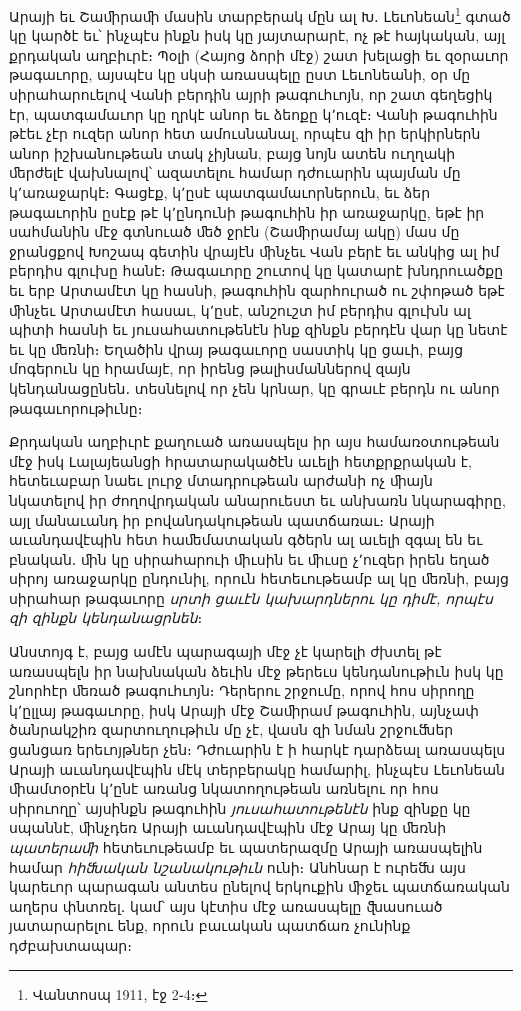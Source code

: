 \documentclass{article}
\begin{document}
{Արայի եւ Շաﬕրաﬕ մասին տարբերակ մըն ալ Խ․ Լեւոնեան\footnote{Վանտոսպ 1911, էջ 2֊4։} գտած կը կարծէ եւ՝ ինչպէս ինքն իսկ կը յայտարարէ, ոչ թէ հայկական, այլ քրդական աղբիւրէ։ Պօլի (Հայոց ձորի մէջ) շատ խելացի եւ զօրաւոր թագաւորը, այսպէս կը սկսի առասպելը ըստ Լեւոնեանի, օր մը սիրահարուելով Վանի բերդին այրի թագուհւոյն, որ շատ գեղեցիկ էր, պատգամաւոր կը ղրկէ անոր եւ ձեոքը կ՚ուզէ։ Վանի թագուհին թէեւ չէր ուզեր անոր հետ ամուսնանալ, որպէս զի իր երկիրներն անոր իշխանութեան տակ չիյնան, բայց նոյն ատեն ուղղակի ﬔրժելէ վախնալով՝ ազատելու համար դժուարին պայման մը կ՚առաջարկէ։ Գացէք, կ՚ըսէ պատգամաւորներուն, եւ ձեր թագաւորին ըսէք թէ կ՚ընդունի թագուհին իր առաջարկը, եթէ իր սահմանին մէջ գտնուած ﬔծ ջրէն (Շաﬕրամայ ակը) մաս մը ջրանցքով Խոշապ գետին վրայէն ﬕնչեւ Վան բերէ եւ անկից ալ իմ բերդիս գլուխը հանէ։ Թագաւորը շուտով կը կատարէ խնդրուածքը եւ երբ Արտամէտ կը հասնի, թագուհին զարհուրած ու շփոթած եթէ ﬕնչեւ Արտամէտ հասաւ, կ՚ըսէ, անշուշտ իմ բերդիս գլուխն ալ պիտի հասնի եւ յուսահատութենէն ինք զինքն բերդէն վար կը նետէ եւ կը ﬔռնի։ Եղածին վրայ թագաւորը սաստիկ կը ցաւի, բայց մոգերուն կը հրամայէ, որ իրենց թալիսմաններով զայն կենդանացընեն․ տեսնելով որ չեն կրնար, կը գրաւէ բերդն ու անոր թագաւորութիւնը։

Քրդական աղբիւրէ քաղուած առասպելս իր այս համառօտութեան մէջ իսկ Լալայեանցի հրատարակածէն աւելի հետքրքրական է, հետեւաբար նաեւ լուրջ մտադրութեան արժանի ոչ ﬕայն նկատելով իր ժողովրդական անարուեստ եւ անխառն նկարագիրը, այլ մանաւանդ իր բովանդակութեան պատճառաւ։ Արայի աւանդավէպին հետ հաﬔմատական գծերն ալ աւելի զգալ են եւ բնական․ ﬕն կը սիրահարուի ﬕւսին եւ ﬕւսը չ՚ուզեր իրեն եղած սիրոյ առաջարկը ընդունիլ, որուն հետեւութեամբ ալ կը ﬔռնի, բայց սիրահար թագաւորը \emph{սրտի ցաւէն կախարդներու կը դիմէ, որպէս զի զինքն կենդանացրնեն}։

Անստոյգ է, բայց ամէն պարագայի մէջ չէ կարելի ժխտել թէ առասպելն իր նախնական ձեւին մէջ թերեւս կենդանութիւն իսկ կը շնորհէր ﬔռած թագուհւոյն։ Դերերու շրջումը, որով հոս սիրողը կ՚ըլլայ թագաւորը, իսկ Արայի մէջ Շաﬕրամ թագուհին, այնչափ ծանրակշիռ զարտուղութիւն մը չէ, վասն զի նման շրջուﬓեր ցանցառ երեւոյթներ չեն։ Դժուարին է ի հարկէ դարձեալ առասպելս Արայի աւանդավէպին մէկ տերբերակը համարիլ, ինչպէս Լեւոնեան ﬕամտօրէն կ՚ընէ առանց նկատողութեան առնելու որ հոս սիրուողը՝ այսինքն թագուհին \emph{յուսահատութենէն} ինք զինքը կը սպաննէ, ﬕնչդեռ Արայի աւանդավէպին մէջ Արայ կը ﬔռնի \emph{պատերաﬕ} հետեւութեամբ եւ պատերազմը Արայի առասպելին համար \emph{հիﬓական նշանակութիւն} ունի։ Անհնար է ուրեﬓ այս կարեւոր պարագան անտես ընելով երկուքին ﬕջեւ պատճառական աղերս փնտռել․ կամ՝ այս կէտիս մէջ առասպելը ﬖասուած յատարարելու ենք, որուն բաւական պատճառ չունինք դժբախտապար։
\clearpage

}
\end{document}
